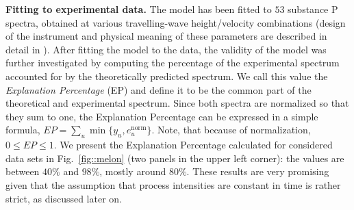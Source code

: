 \documentclass{llncs}
\begin{document}
\textbf{Fitting to experimental data.} The model has been fitted to $53$ substance P spectra, obtained at various travelling-wave height/velocity combinations (design of the instrument and physical meaning of these parameters are described in detail in \cite{Lermyte2015-eb}). After fitting the model to the data, the validity of the model was further investigated by computing the percentage of the experimental spectrum accounted for by the theoretically predicted spectrum. We call this value the \textit{Explanation Percentage} (EP) and define it to be the common part of the theoretical and experimental spectrum. Since both spectra are normalized so that they sum to one, the Explanation Percentage can be expressed in a simple formula,
$ EP = \sum_u \min\{y_u, e_u^\text{norm}\}.$
Note, that because of normalization, $0 \leq EP \leq 1$. We present the Explanation Percentage calculated for considered data sets in Fig.~\ref{fig::melon} (two panels in the upper left corner): the values are between $40\%$ and $98\%$, mostly around $80\%$. These results are very promising given that the assumption that process intensities are constant in time is rather strict, as discussed later on.
\end{document}
